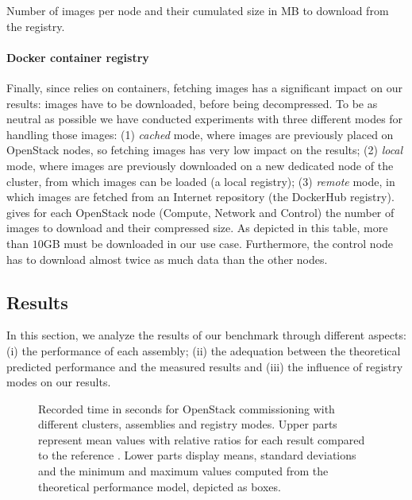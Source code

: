 \begin{table}
  \begin{center}
    
    \caption{Number of \docker images per node and their cumulated size in MB to
      download from the registry.}
    \label{tab:images}
  \end{center}
\end{table}

\paragraph{Docker container registry}
Finally, since \kolla relies on \docker containers, fetching \docker
images has a significant impact on our results: images have to be
downloaded, before being decompressed. To be as neutral as possible we
have conducted experiments with three different modes for handling
those images: (1) \emph{cached} mode, where images are previously
placed on OpenStack nodes, so fetching \docker images has very low impact on
the results; (2) \emph{local} mode, where images are previously
downloaded on a new dedicated node of the cluster, from which images
can be loaded (\ie a local \docker registry); (3) \emph{remote} mode,
in which images are fetched from an Internet repository (\ie the
DockerHub registry).  gives for each OpenStack node
(\ie Compute, Network and Control) the number of \docker images to
download and their compressed size.  As depicted in this table, more
than $10$GB must be downloaded in our use case.  Furthermore, the
control node has to download almost twice as much data than the other
nodes.

\subsection{Results}

In this section, we analyze the results of our benchmark through
different aspects: (i) the performance of each assembly; (ii) the
adequation between the theoretical predicted performance and the
measured results and (iii) the influence of registry modes on our
results.

\begin{figure}[t!]
  \begin{center}
    \def\svgwidth{\columnwidth}
    \def\svgwidth{\columnwidth}
    \caption{Recorded time in seconds for OpenStack commissioning with
      different clusters, assemblies and registry modes. Upper parts
      represent mean values with relative ratios for each result
      compared to the reference \ansass.  Lower parts display means,
      standard deviations and the minimum and maximum values computed
      from the theoretical performance model, depicted as boxes.}
    \label{fig:openstack_results}
  \end{center}
\end{figure}

